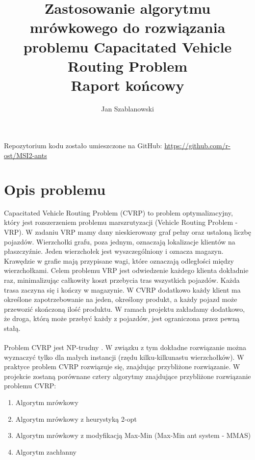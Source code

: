 \documentclass{article}
\title{Zastosowanie algorytmu mrówkowego do rozwiązania problemu Capacitated Vehicle Routing Problem \\ \large{Raport końcowy}}
\author{Jan Szablanowski}
\begin{document}
\date{}
\maketitle

\vspace{2cm}
\hypersetup{
    linkcolor=black,
    citecolor=black,
    urlcolor=black
}

\abstract{}

Repozytorium kodu zostało umieszczone na GitHub: \url{https://github.com/r-ost/MSI2-ants}

\tableofcontents
\newpage



\section{Opis problemu}

Capacitated Vehicle Routing Problem (CVRP) to problem optymalizacyjny, który jest rozszerzeniem problemu marszrutyzacji (Vehicle Routing Problem - VRP). W zadaniu VRP mamy dany nieskierowany graf pełny oraz ustaloną liczbę pojazdów. Wierzchołki grafu, poza jednym, oznaczają lokalizacje klientów na płaszczyźnie. Jeden wierzchołek jest wyszczególniony i oznacza magazyn. Krawędzie w grafie mają przypisane wagi, które oznaczają odległości między wierzchołkami. Celem problemu VRP jest odwiedzenie każdego klienta dokładnie raz, minimalizując całkowity koszt przebycia tras wszystkich pojazdów. Każda trasa zaczyna się i kończy w magazynie. W CVRP dodatkowo każdy klient ma określone zapotrzebowanie na jeden, określony produkt, a każdy pojazd może przewozić skończoną ilość produktu. W ramach projektu zakładamy dodatkowo, że droga, którą może przebyć każdy z pojazdów, jest ograniczona przez pewną stałą.
\\ \\
Problem CVRP jest NP-trudny \cite{lenstra}. W związku z tym dokładne rozwiązanie można wyznaczyć tylko dla małych instancji (rzędu kilku-kilkunastu wierzchołków). W praktyce problem CVRP rozwiązuje się, znajdując przybliżone rozwiązanie. W projekcie zostaną porównane cztery algorytmy znajdujące przybliżone rozwiązanie problemu CVRP:
\begin{enumerate}
    \item Algorytm mrówkowy
    \item Algorytm mrówkowy z heurystyką 2-opt
    \item Algorytm mrówkowy z modyfikacją Max-Min (Max-Min ant system - MMAS)
    \item Algorytm zachłanny
\end{enumerate}
\end{document}

